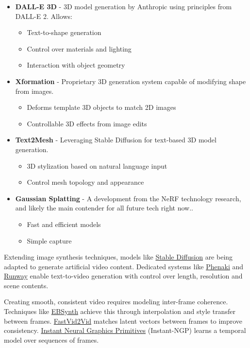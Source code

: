 \begin{itemize}
\item \textbf{DALL-E 3D} - 3D model generation by Anthropic using principles from DALL-E 2. Allows:
\begin{itemize}
\item Text-to-shape generation
\item Control over materials and lighting
\item Interaction with object geometry
\end{itemize}

\item \textbf{Xformation} - Proprietary 3D generation system capable of modifying shape from images.
\begin{itemize}
\item Deforms template 3D objects to match 2D images
\item Controllable 3D effects from image edits
\end{itemize}

\item \textbf{Text2Mesh} - Leveraging Stable Diffusion for text-based 3D model generation.
\begin{itemize}
\item 3D stylization based on natural language input
\item Control mesh topology and appearance
\end{itemize}

\item \textbf{Gaussian Splatting} - A development from the NeRF technology research, and likely the main contender for all future tech right now..
\begin{itemize}
\item Fast and efficient models
\item Simple capture
\end{itemize}

\end{itemize}


Extending image synthesis techniques, models like \href{https://arxiv.org/abs/2105.05233}{Stable Diffusion} are being adapted to generate artificial video content. Dedicated systems like \href{https://www.anthropic.com/research/phenaki}{Phenaki} and \href{https://runwayml.com}{Runway} enable text-to-video generation with control over length, resolution and scene contents.

Creating smooth, consistent video requires modeling inter-frame coherence. Techniques like \href{https://ebsynth.com}{EBSynth} achieve this through interpolation and style transfer between frames. \href{https://www.fastvideoai.com}{FastVid2Vid} matches latent vectors between frames to improve consistency. \href{https://nvlabs.github.io/instant-ngp}{Instant Neural Graphics Primitives} (Instant-NGP) learns a temporal model over sequences of frames.

